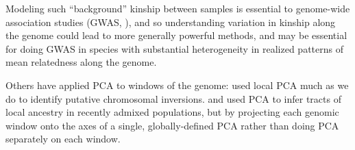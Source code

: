 \documentclass[11pt, oneside]{article}   	%
\newcommand\citet{\cite}
\newcommand\citep{\cite}
\renewcommand{\revpoint}[2]{\relax}
\begin{document}
Modeling such ``background'' kinship between samples
is essential to genome-wide association studies (GWAS, \citet{price2006principal,astle2009population}),
and so understanding variation in kinship along the genome 
could lead to more generally powerful methods,
and may be essential for doing GWAS in species with substantial heterogeneity in realized patterns of mean relatedness along the genome.


Others have applied PCA to windows of the genome:
\citet{ma2012investigation} used local PCA much as we do 
to identify putative chromosomal inversions.
\citet{bryc2010genomewide} and \citet{brisbin2012pcadmix}
used PCA to infer tracts of local ancestry in recently admixed populations,
but by projecting each genomic window onto the axes of a single, globally-defined PCA
rather than doing PCA separately on each window.  %
\end{document}
